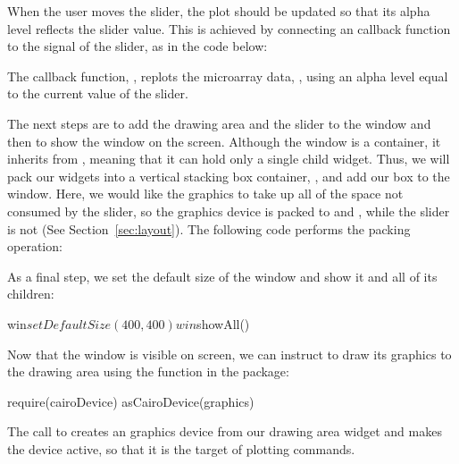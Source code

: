 \documentclass[article,shortnames]{jss}
\begin{document}
When the user moves the slider, the plot should be updated so that its
alpha level reflects the slider value. This is achieved by connecting
an  callback function to the  signal
of the slider, as in the code below:
The callback function, , replots the
microarray data, , using an alpha level equal to the
current value of the slider.

The next steps are to add the drawing area and the slider to the
window and then to show the window on the screen. Although the window
is a container, it inherits from , meaning that it can
hold only a single child widget. Thus, we will pack our widgets into a
vertical stacking box container, , and add our box to
the window.  Here, we would like the graphics to take up all of the
space not consumed by the slider, so the graphics device is packed to
 and , while the slider is not
(See Section~\ref{sec:layout}). The following code performs the
packing operation:

As a final step, we set the default size of the window and show it and
all of its children:
\begin{Code}
win$setDefaultSize(400,400)
win$showAll() 
\end{Code}

Now that the window is visible on screen, we can instruct 
to draw its graphics to the drawing area using the
 function in the  package:
\begin{Code}
require(cairoDevice)
asCairoDevice(graphics)
\end{Code}
The call to  creates an  graphics
device from our drawing area widget and makes the device active, so
that it is the target of  plotting commands.
\end{document}
